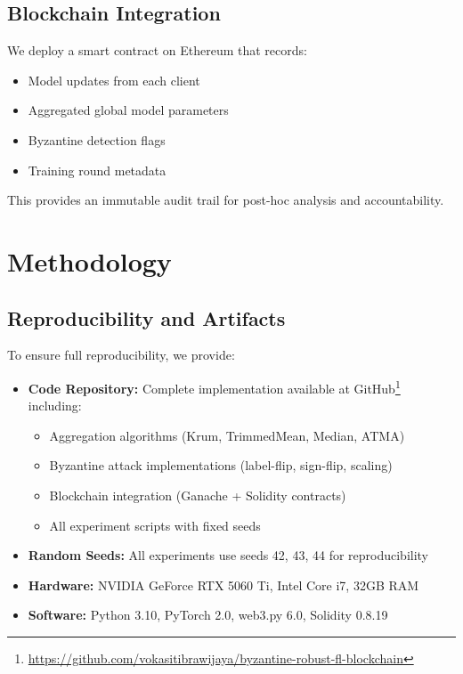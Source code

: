 \documentclass[12pt,a4paper,onecolumn]{article}
\begin{document}
\subsection{Blockchain Integration}

We deploy a smart contract on Ethereum that records:
\begin{itemize}
    \item Model updates from each client
    \item Aggregated global model parameters
    \item Byzantine detection flags
    \item Training round metadata
\end{itemize}

This provides an immutable audit trail for post-hoc analysis and accountability.

\section{Methodology}
\label{sec:methodology}

\subsection{Reproducibility and Artifacts}

To ensure full reproducibility, we provide:
\begin{itemize}
    \item \textbf{Code Repository:} Complete implementation available at GitHub\footnote{\url{https://github.com/vokasitibrawijaya/byzantine-robust-fl-blockchain}} including:
    \begin{itemize}
        \item Aggregation algorithms (Krum, TrimmedMean, Median, ATMA)
        \item Byzantine attack implementations (label-flip, sign-flip, scaling)
        \item Blockchain integration (Ganache + Solidity contracts)
        \item All experiment scripts with fixed seeds
    \end{itemize}
    \item \textbf{Random Seeds:} All experiments use seeds 42, 43, 44 for reproducibility
    \item \textbf{Hardware:} NVIDIA GeForce RTX 5060 Ti, Intel Core i7, 32GB RAM
    \item \textbf{Software:} Python 3.10, PyTorch 2.0, web3.py 6.0, Solidity 0.8.19
\end{itemize}
\end{document}
